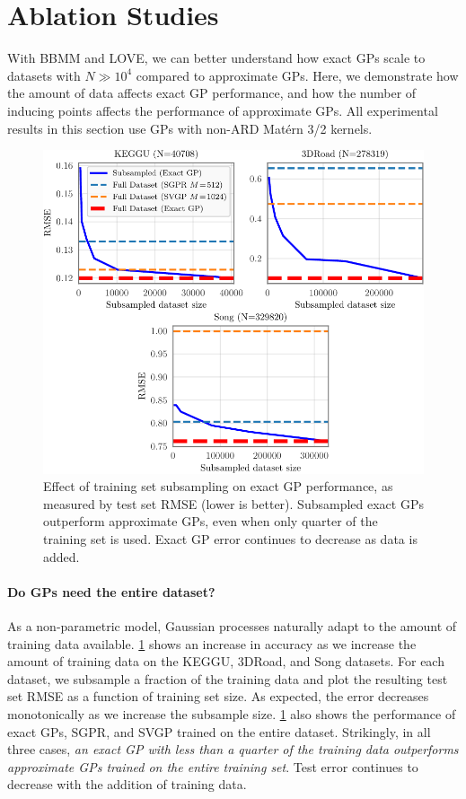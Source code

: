 \section{Ablation Studies}
With BBMM and LOVE, we can better understand how exact GPs scale to datasets with $N\gg 10^4$ compared to approximate GPs.
Here, we demonstrate how the amount of data affects exact GP performance, and how the number of inducing points affects the performance of approximate GPs.
All experimental results in this section use GPs with non-ARD Mat\'ern 3/2 kernels.

\begin{figure}[t!]
  \centering
  \includegraphics[width=0.7\linewidth]{figures/subsampling.pdf}
  \caption[Effect of training set subsampling on exact GP performance.]{
    Effect of training set subsampling on exact GP performance, as measured by test set RMSE (lower is better).
    Subsampled exact GPs outperform approximate GPs, even when only quarter of the training set is used.
    Exact GP error continues to decrease as data is added.
  }
  \label{fig:subsampling_results}
\end{figure}

\paragraph{Do GPs need the entire dataset?}
As a non-parametric model, Gaussian processes naturally adapt to the amount of training data available.
\cref{fig:subsampling_results} shows an increase in accuracy as we increase the amount of training data on the KEGGU, 3DRoad, and Song datasets.
For each dataset, we subsample a fraction of the training data and plot the resulting test set RMSE as a function of training set size.
As expected, the error decreases monotonically as we increase the subsample size.
\cref{fig:subsampling_results} also shows the performance of exact GPs, SGPR, and SVGP trained on the entire dataset.
Strikingly, in all three cases, \textit{an exact GP with less than a quarter of the training data outperforms approximate GPs trained on the entire training set}.
Test error continues to decrease with the addition of training data.

